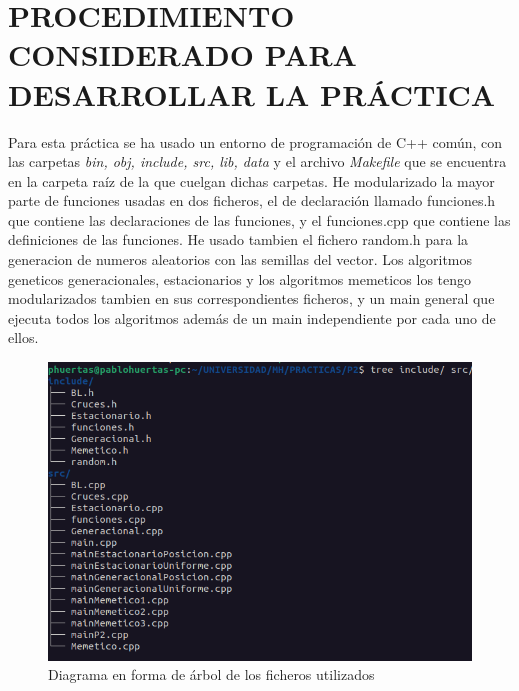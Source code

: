 \documentclass{article}
\begin{document}
\newpage 
\section {\large PROCEDIMIENTO CONSIDERADO PARA DESARROLLAR LA PRÁCTICA}
Para esta práctica se ha usado un entorno de programación de C++ común, con las carpetas
\emph{bin, obj, include, src, lib, data} y el archivo \emph{Makefile} que se encuentra en la carpeta raíz 
de la que cuelgan dichas carpetas.
He modularizado la mayor parte de funciones usadas en dos ficheros, el de declaración llamado 
funciones.h que contiene las declaraciones de las funciones, y el funciones.cpp que contiene las definiciones
de las funciones.
\newline He usado tambien el fichero random.h para la generacion de numeros aleatorios con las 
semillas del vector.
\newline Los algoritmos geneticos generacionales, estacionarios y los algoritmos memeticos los 
tengo modularizados tambien en sus correspondientes ficheros, y un main general que ejecuta todos los 
algoritmos además de un main independiente por cada uno de ellos.
\maketitle
\begin{figure}[h]
    \centering
    \includegraphics[scale=0.5]{TreeIncludeSrc.png}
    \caption{Diagrama en forma de árbol de los ficheros utilizados}
\end{figure}
\end{document}
